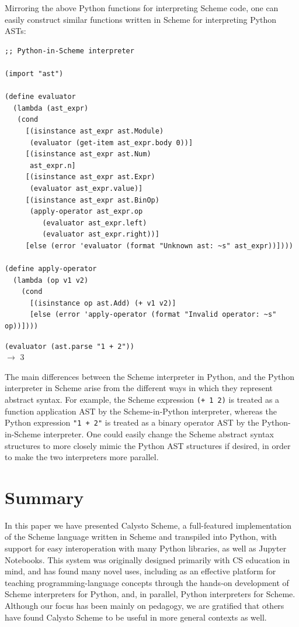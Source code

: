 \documentclass[acmsmall,screen,anonymous,review]{acmart}
\begin{document}
Mirroring the above Python functions for interpreting Scheme code, one can
easily construct similar functions written in Scheme for interpreting Python
ASTs:\\

\begin{minipage}{\textwidth}
{\small
\begin{verbatim}
;; Python-in-Scheme interpreter

(import "ast")

(define evaluator
  (lambda (ast_expr)
   (cond
     [(isinstance ast_expr ast.Module)
      (evaluator (get-item ast_expr.body 0))]
     [(isinstance ast_expr ast.Num)
      ast_expr.n]
     [(isinstance ast_expr ast.Expr)
      (evaluator ast_expr.value)]
     [(isinstance ast_expr ast.BinOp)
      (apply-operator ast_expr.op
         (evaluator ast_expr.left)
         (evaluator ast_expr.right))]
     [else (error 'evaluator (format "Unknown ast: ~s" ast_expr))])))

(define apply-operator
  (lambda (op v1 v2)
    (cond
      [(isinstance op ast.Add) (+ v1 v2)]
      [else (error 'apply-operator (format "Invalid operator: ~s" op))])))

\end{verbatim}
\texttt{(evaluator (ast.parse "1 + 2"))}\\
$\rightarrow$ 3\\
}
\end{minipage}

\noindent
The main differences between the Scheme interpreter in Python, and the Python
interpreter in Scheme arise from the different ways in which they represent
abstract syntax.  For example, the Scheme expression \texttt{(+~1~2)} is
treated as a function application AST by the Scheme-in-Python interpreter,
whereas the Python expression \texttt{"1~+~2"} is treated as a binary operator
AST by the Python-in-Scheme interpreter.  One could easily change the Scheme
abstract syntax structures to more closely mimic the Python AST structures if
desired, in order to make the two interpreters more parallel.

\section{Summary}

In this paper we have presented Calysto Scheme, a full-featured implementation
of the Scheme language written in Scheme and transpiled into Python, with
support for easy interoperation with many Python libraries, as well as Jupyter
Notebooks. This system was originally designed primarily with CS education in
mind, and has found many novel uses, including as an effective platform for
teaching programming-language concepts through the hands-on development of
Scheme interpreters for Python, and, in parallel, Python interpreters for
Scheme. Although our focus has been mainly on pedagogy, we are gratified that
others have found Calysto Scheme to be useful in more general contexts as well.
\end{document}
